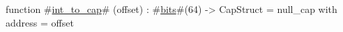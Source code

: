 function #\hyperref[zintzytozycap]{int\_to\_cap}# (offset) : #\hyperref[zbits]{bits}#(64) -> CapStruct = 
    {null_cap with address = offset}
